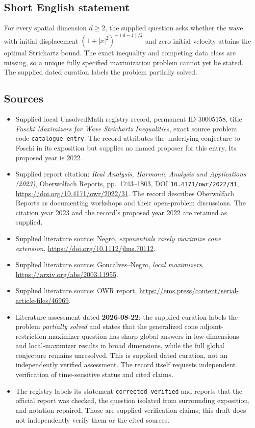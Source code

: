 \documentclass[11pt]{article}
\begin{document}
\subsection{Short English statement}
For every spatial dimension \(d\geq2\), the supplied question asks whether the wave with initial displacement \((1+|x|^2)^{-(d-1)/2}\) and zero initial velocity attains the optimal Strichartz bound. The exact inequality and competing data class are missing, so a unique fully specified maximization problem cannot yet be stated. The supplied dated curation labels the problem partially solved.
\subsection{Sources}
\begin{itemize}
\item Supplied local UnsolvedMath registry record, permanent ID \(30005158\), title \emph{Foschi Maximizers for Wave Strichartz Inequalities}, exact source problem code \texttt{catalogue entry}. The record attributes the underlying conjecture to Foschi in its exposition but supplies no named proposer for this entry. Its proposed year is 2022.
\item Supplied report citation: \emph{Real Analysis, Harmonic Analysis and Applications (2023)}, Oberwolfach Reports, pp.~1743--1803, DOI \texttt{10.4171/owr/2022/31}, \url{https://doi.org/10.4171/owr/2022/31}. The record describes Oberwolfach Reports as documenting workshops and their open-problem discussions. The citation year 2023 and the record's proposed year 2022 are retained as supplied.
\item Supplied literature source: Negro, \emph{exponentials rarely maximize cone extension}, \url{https://doi.org/10.1112/jlms.70112}.
\item Supplied literature source: Goncalves--Negro, \emph{local maximizers}, \url{https://arxiv.org/abs/2003.11955}.
\item Supplied literature source: OWR report, \url{https://ems.press/content/serial-article-files/46969}.
\item Literature assessment dated \textbf{2026-08-22}: the supplied curation labels the problem \emph{partially solved} and states that the generalized cone adjoint-restriction maximizer question has sharp global answers in low dimensions and local-maximizer results in broad dimensions, while the full global conjecture remains unresolved. This is supplied dated curation, not an independently verified assessment. The record itself requests independent verification of time-sensitive status and cited claims.
\item The registry labels its statement \texttt{corrected\_verified} and reports that the official report was checked, the question isolated from surrounding exposition, and notation repaired. Those are supplied verification claims; this draft does not independently verify them or the cited sources.
\end{itemize}
\end{document}
